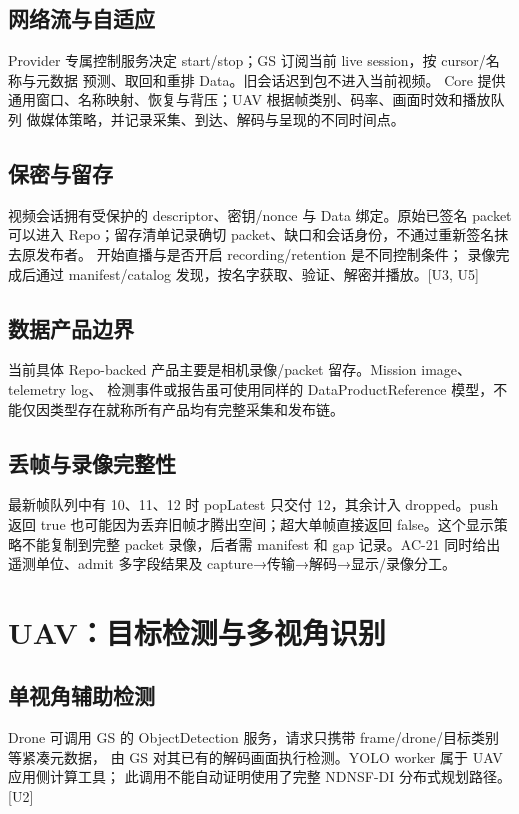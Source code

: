 \subsection{网络流与自适应}
Provider 专属控制服务决定 start/stop；GS 订阅当前 live session，按 cursor/名称与元数据
预测、取回和重排 Data。旧会话迟到包不进入当前视频。
Core 提供通用窗口、名称映射、恢复与背压；UAV 根据帧类别、码率、画面时效和播放队列
做媒体策略，并记录采集、到达、解码与呈现的不同时间点。

\subsection{保密与留存}
视频会话拥有受保护的 descriptor、密钥/nonce 与 Data 绑定。原始已签名 packet 可以进入
Repo；留存清单记录确切 packet、缺口和会话身份，不通过重新签名抹去原发布者。
开始直播与是否开启 recording/retention 是不同控制条件；
录像完成后通过 manifest/catalog 发现，按名字获取、验证、解密并播放。[U3, U5]

\subsection{数据产品边界}
当前具体 Repo-backed 产品主要是相机录像/packet 留存。Mission image、telemetry log、
检测事件或报告虽可使用同样的 DataProductReference 模型，不能仅因类型存在就称所有产品均有完整采集和发布链。



\subsection{丢帧与录像完整性}
最新帧队列中有 10、11、12 时 popLatest 只交付 12，其余计入 dropped。push 返回 true 也可能因为丢弃旧帧才腾出空间；超大单帧直接返回 false。这个显示策略不能复制到完整 packet 录像，后者需 manifest 和 gap 记录。AC-21 同时给出遥测单位、admit 多字段结果及 capture→传输→解码→显示/录像分工。

\newpage

\section{UAV：目标检测与多视角识别}
\subsection{单视角辅助检测}
Drone 可调用 GS 的 ObjectDetection 服务，请求只携带 frame/drone/目标类别等紧凑元数据，
由 GS 对其已有的解码画面执行检测。YOLO worker 属于 UAV 应用侧计算工具；
此调用不能自动证明使用了完整 NDNSF-DI 分布式规划路径。[U2]

